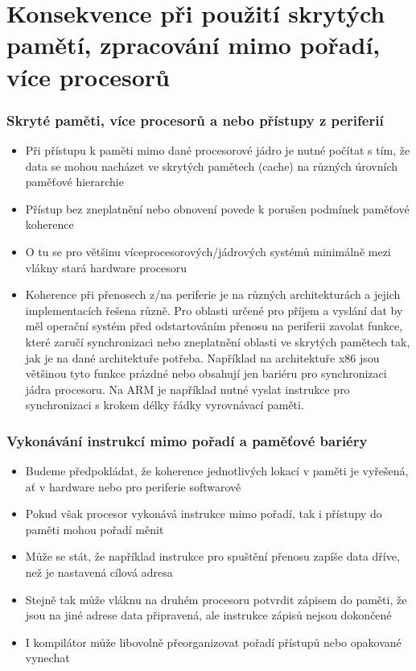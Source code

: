\documentclass{beamer}
\begin{document}
\section{Konsekvence při použití skrytých pamětí, zpracování mimo pořadí, více procesorů}

\begin{frame}
\frametitle{Skryté paměti, více procesorů a nebo přístupy z periferií}

\begin{itemize}
 \item Při přístupu k paměti mimo dané procesorové jádro je nutné počítat s tím, že data se mohou
       nacházet ve skrytých pamětech (cache) na různých úrovních paměťové hierarchie
 \item Přístup bez zneplatnění nebo obnovení povede k porušen podmínek paměťové koherence
 \item O tu se pro většinu víceprocesorových/jádrových systémů minimálně mezi vlákny
       stará hardware procesoru
 \item Koherence při přenosech z/na periferie je na různých architekturách a jejich implementacích
       řešena různě. Pro oblasti určené pro příjem a vyslání dat by měl operační systém
       před odstartováním přenosu na periferii zavolat funkce, které zaručí synchronizaci
       nebo zneplatnění oblasti ve skrytých pamětech tak, jak je na dané architektuře potřeba.
       Například na architektuře x86 jsou většinou tyto funkce prázdné nebo obsahují
       jen bariéru pro synchronizaci jádra procesoru. Na ARM je například nutné vyslat
       instrukce pro synchronizaci s krokem délky řádky vyrovnávací paměti.

\end{itemize}
\end{frame}

\begin{frame}[fragile]
\frametitle{Vykonávání instrukcí mimo pořadí a paměťové bariéry}

\begin{itemize}
 \item Budeme předpokládat, že koherence jednotlivých lokací v paměti je vyřešená, ať v hardware nebo pro periferie softwarově
 \item Pokud však procesor vykonává instrukce mimo pořadí, tak i přístupy do paměti mohou pořadí měnit
 \item Může se stát, že například instrukce pro spuštění přenosu zapíše data dříve, než je nastavená cílová adresa
 \item Stejně tak může vláknu na druhém procesoru potvrdit zápisem do paměti, že jsou na jiné adrese data připravená,
       ale instrukce zápisů nejsou dokončené
 \item I kompilátor může libovolně přeorganizovat pořadí přístupů nebo opakované vynechat
\end{itemize}

\end{frame}
\end{document}
